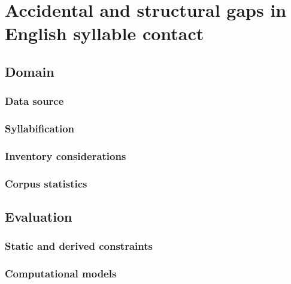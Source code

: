 \documentclass{upenndiss}
\begin{document}
\chapter[2]{Accidental and structural gaps in English syllable contact} %
\label{clusters}
    \section{Domain} %
        \subsection{Data source} %
        \subsection{Syllabification} 
        \subsection{Inventory considerations} 
        \subsection{Corpus statistics} 
    \section{Evaluation} %
        \subsection{Static and derived constraints} 
        \subsection{Computational models} 
\end{document}
